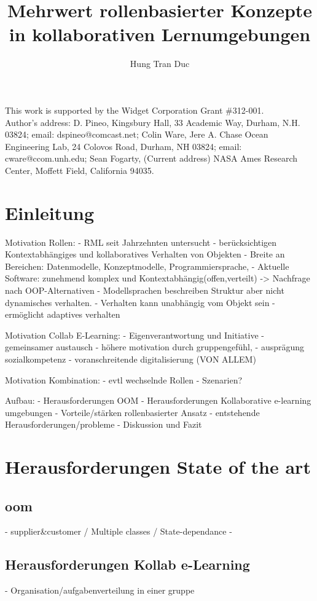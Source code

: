 \documentclass[prodmode,acmtap]{acmlarge}
\title{Mehrwert rollenbasierter Konzepte in kollaborativen Lernumgebungen}
\author{Hung Tran Duc \affil{Technische Universität Dresden} }
\begin{document}
\begin{bottomstuff}
This work is supported by the Widget Corporation Grant \#312-001.\\
Author's address: D. Pineo, Kingsbury Hall, 33 Academic Way, Durham,
N.H. 03824; email: dspineo@comcast.net; Colin Ware, Jere A. Chase
Ocean Engineering Lab, 24 Colovos Road, Durham, NH 03824; email: cware@ccom.unh.edu;
Sean Fogarty, (Current address) NASA Ames Research Center, Moffett Field, California 94035.
\end{bottomstuff}


\maketitle

\section{Einleitung}
Motivation Rollen:
- RML seit Jahrzehnten untersucht
- berücksichtigen Kontextabhängiges und kollaboratives Verhalten von Objekten
- Breite an Bereichen: Datenmodelle, Konzeptmodelle, Programmiersprache,
- Aktuelle Software: zunehmend komplex und Kontextabhängig(offen,verteilt) -> Nachfrage nach OOP-Alternativen
- Modellsprachen beschreiben Struktur aber nicht dynamisches verhalten.
- Verhalten kann unabhängig vom Objekt sein
- ermöglicht adaptives verhalten

Motivation  Collab E-Learning:
- Eigenverantwortung und Initiative
- gemeinsamer austausch
- höhere motivation durch gruppengefühl, 
- ausprägung sozialkompetenz
- voranschreitende digitalisierung (VON ALLEM) 

Motivation Kombination:
- evtl wechselnde Rollen
- Szenarien? 

Aufbau:
- Herausforderungen OOM
- Herausforderungen Kollaborative e-learning umgebungen
- Vorteile/stärken rollenbasierter Ansatz
- entstehende Herausforderungen/probleme
- Diskussion und Fazit


\section{Herausforderungen State of the art}
\subsection{oom}

- supplier&customer / Multiple classes / State-dependance
- 
\subsection{Herausforderungen Kollab e-Learning}
- Organisation/aufgabenverteilung in einer gruppe
\end{document}
